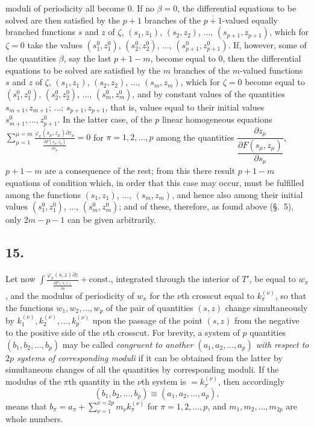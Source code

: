 \documentclass{article}
\begin{document}
moduli of periodicity all become 0. If no $\beta = 0$, the differential equations to be solved are then satisfied by the $p+1$ branches of the $\overline{p+1}$-valued equally branched functions $s$ and $z$ of $\zeta$, $(s_{1}, z_{1})$, $(s_{2}, z_{2})$, $\ldots$, $(s_{p+1}, z_{p+1})$, which for $\zeta = 0$ take the values $(s_{1}^{0}, z_{1}^{0})$, $(s_{2}^{0}, z_{2}^{0})$, $\ldots$, $(s_{p+1}^{0}, z_{p+1}^{0})$. If, however, some of the quantities $\beta$, say the last $p+1-m$, become equal to 0, then the differential equations to be solved are satisfied by the $m$ branches of the $m$-valued functions $s$ and $z$ of $\zeta$, $(s_{1}, z_{1})$, $(s_{2}, z_{2})$, $\ldots$, $(s_{m}, z_{m})$, which for $\zeta = 0$ become equal to $(s_{1}^{0}, z_{1}^{0})$, $(s_{2}^{0}, z_{2}^{0})$, $\ldots$, $(s_{m}^{0}, z_{m}^{0})$, and by constant values of the quantities $s_{m+1}, z_{m+1}$; $\ldots$; $s_{p+1}, z_{p+1}$, that is, values equal to their initial values $s_{m+1}^{0}, \ldots, z_{p+1}^{0}$. In the latter case, of the $p$ linear homogeneous equations $\displaystyle\sum_{\mu=1}^{\mu=m} \frac{\varphi_{\pi}(s_{\mu}, z_{\mu}) \partial z_{\mu}}{\frac{\partial F(s_{\mu}, z_{\mu})}{\partial s_{\mu}}} = 0$ for $\pi = 1, 2, \ldots, p$ among the quantities $\dfrac{\partial z_{\mu}}{\dfrac{\partial F(s_{\mu}, z_{\mu})}{\partial s_{\mu}}}$, $p+1-m$ are a consequence of the rest; from this there result $p+1-m$ equations of condition which, in order that this case may occur, must be fulfilled among the functions $(s_{1}, z_{1})$, $\ldots$, $(s_{m}, z_{m})$, and hence also among their initial values $(s_{1}^{0}, z_{1}^{0})$, $\ldots$, $(s_{m}^{0}, z_{m}^{0})$; and of these, therefore, as found above (§.~5), only $2m-p-1$ can be given arbitrarily.

\subsection*{15.}

Let now $\displaystyle\int \frac{\varphi_{\pi}(s, z) \partial z}{\frac{\partial F(s, z)}{\partial s}} + \text{const.}$, integrated through the interior of $T'$, be equal to $w_{\pi}$, and the modulus of periodicity of $w_{\pi}$ for the $\nu$th crosscut equal to $k_{\pi}^{(\nu)}$, so that the functions $w_{1}, w_{2}, \ldots, w_{p}$ of the pair of quantities $(s, z)$ change simultaneously by $k_{1}^{(\nu)}, k_{2}^{(\nu)}, \ldots, k_{p}^{(\nu)}$ upon the passage of the point $(s, z)$ from the negative to the positive side of the $\nu$th crosscut. For brevity, a system of $p$ quantities $(b_{1}, b_{2}, \ldots, b_{p})$ may be called \emph{congruent to another $(a_{1}, a_{2}, \ldots, a_{p})$ with respect to $2p$ systems of corresponding moduli} if it can be obtained from the latter by simultaneous changes of all the quantities by corresponding moduli. If the modulus of the $\pi$th quantity in the $\nu$th system is $= k_{\pi}^{(\nu)}$, then accordingly
\[ (b_{1}, b_{2}, \ldots, b_{p}) \equiv (a_{1}, a_{2}, \ldots, a_{p}), \]
means that $b_{\pi} = a_{\pi} + \displaystyle\sum_{\nu=1}^{\nu=2p} m_{\nu} k_{\pi}^{(\nu)}$ for $\pi = 1, 2, \ldots, p$, and $m_{1}, m_{2}, \ldots, m_{2p}$ are whole numbers.
\end{document}
